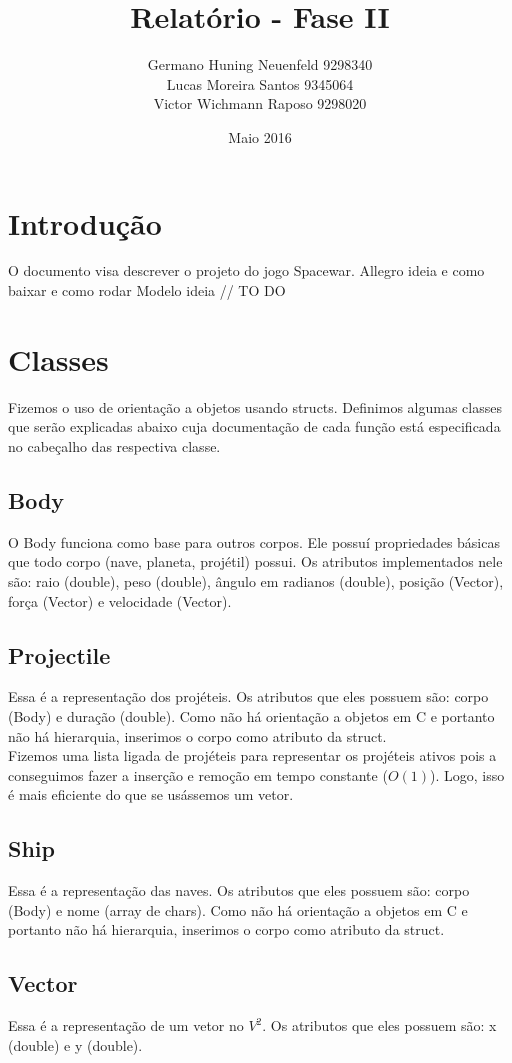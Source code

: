 \documentclass{article}
\title{Relatório - Fase II}
\author{
    Germano Huning Neuenfeld 9298340
    \\
    Lucas Moreira Santos 9345064
    \\
    Victor Wichmann Raposo 9298020
}
\date{Maio 2016}
\begin{document}
\maketitle
\section{Introdução}
O documento visa descrever o projeto do jogo Spacewar. Allegro ideia e como baixar e como rodar Modelo ideia // TO DO

\section{Classes}
Fizemos o uso de orientação a objetos usando structs. Definimos algumas classes que serão explicadas abaixo
cuja documentação de cada função está especificada no cabeçalho das respectiva classe.

\subsection{Body}
O Body funciona como base para outros corpos. Ele possuí propriedades básicas que todo corpo (nave, planeta, projétil) possui.
Os atributos implementados nele são: raio (double), peso (double), ângulo em radianos (double), posição (Vector), força (Vector) e velocidade (Vector).

\subsection{Projectile}
Essa é a representação dos projéteis. Os atributos que eles possuem são: corpo (Body) e duração (double).
Como não há orientação a objetos em C e portanto não há hierarquia, inserimos o corpo como atributo da struct.\\
Fizemos uma lista ligada de projéteis para representar os projéteis ativos pois a conseguimos fazer a inserção e remoção em tempo constante ($O(1)$).
Logo, isso é mais eficiente do que se usássemos um vetor.

\subsection{Ship}
Essa é a representação das naves. Os atributos que eles possuem são: corpo (Body) e nome (array de chars).
Como não há orientação a objetos em C e portanto não há hierarquia, inserimos o corpo como atributo da struct.

\subsection{Vector}
Essa é a representação de um vetor no $V^2$. Os atributos que eles possuem são: x (double) e y (double).
\end{document}
